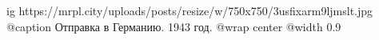  
 
 
 
 

\ifcmt
  ig https://mrpl.city/uploads/posts/resize/w/750x750/3usfixarm9ljmslt.jpg
	@caption Отправка в Германию. 1943 год.
  @wrap center
  @width 0.9
\fi
